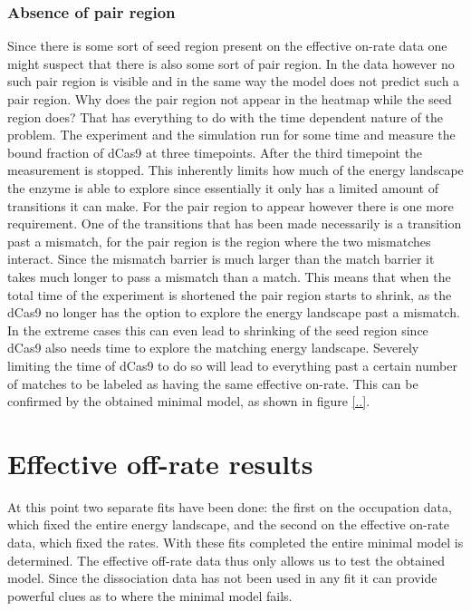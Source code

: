 \subsubsection{Absence of pair region}
Since there is some sort of seed region present on the effective on-rate data one might suspect that there is also some sort of pair region. In the data however no such pair region is visible and in the same way the model does not predict such a pair region. Why does the pair region not appear in the heatmap while the seed region does? That has everything to do with the time dependent nature of the problem. The experiment and the simulation run for some time and measure the bound fraction of dCas9 at three timepoints. After the third timepoint the measurement is stopped. This inherently limits how much of the energy landscape the enzyme is able to explore since essentially it only has a limited amount of transitions it can make. For the pair region to appear however there is one more requirement. One of the transitions that has been made necessarily is a transition past a mismatch, for the pair region is the region where the two mismatches interact. Since the mismatch barrier is much larger than the match barrier it takes much longer to pass a mismatch than a match. This means that when the total time of the experiment is shortened the pair region starts to shrink, as the dCas9 no longer has the option to explore the energy landscape past a mismatch. In the extreme cases this can even lead to shrinking of the seed region since dCas9 also needs time to explore the matching energy landscape. Severely limiting the time of dCas9 to do so will lead to everything past a certain number of matches to be labeled as having the same effective on-rate. This can be confirmed by the obtained minimal model, as shown in figure \ref{..}.



\section{Effective off-rate results}

At this point two separate fits have been done: the first on the occupation data, which fixed the entire energy landscape, and the second on the effective on-rate data, which fixed the rates. With these fits completed the entire minimal model is determined. The effective off-rate data thus only allows us to test the obtained model. Since the dissociation data has not been used in any fit it can provide powerful clues as to where the minimal model fails.

